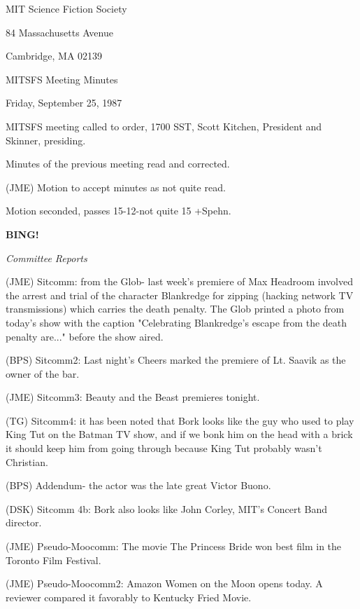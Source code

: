 \documentclass[12pt]{article}
\newcommand{\bing}{{\bf BING!} }
\newcommand{\goto}[1]{\bing \vskip 12pt \centerline{{\em{#1}}}}
\begin{document}
\begin{center}

MIT Science Fiction Society 

84 Massachusetts Avenue

Cambridge, MA 02139

\vspace{12pt}

MITSFS Meeting Minutes 

Friday, September 25, 1987

\end{center}
 
\vspace{18pt}

\setlength{\parskip}{6pt}

\noindent
MITSFS meeting called to order, 1700 SST,
Scott Kitchen, President and Skinner, presiding.

Minutes of the previous meeting read and corrected.

(JME) Motion to accept minutes as not quite read.

Motion seconded, passes 15-12-not quite 15 +Spehn.

\goto{Committee Reports}

(JME) Sitcomm: from the Glob- last week's premiere of Max Headroom involved the arrest and trial of the character Blankredge for zipping (hacking network TV transmissions) which carries the death penalty. The Glob printed a photo from today's show with the caption "Celebrating Blankredge's escape from the death penalty are..." before the show aired.

(BPS) Sitcomm2: Last night's Cheers marked the premiere of Lt. Saavik as the owner of the bar.

(JME) Sitcomm3: Beauty and the Beast premieres tonight.

(TG) Sitcomm4: it has been noted that Bork looks like the guy who used to play King Tut on the Batman TV show, and if we bonk him on the head with a brick it should keep him from going through because King Tut probably wasn't Christian.

(BPS) Addendum- the actor was the late great Victor Buono.

(DSK) Sitcomm 4b: Bork also looks like John Corley, MIT's Concert Band director.

(JME) Pseudo-Moocomm: The movie The Princess Bride won best film in the Toronto Film Festival.

(JME) Pseudo-Moocomm2: Amazon Women on the Moon opens today. A reviewer compared it favorably to Kentucky Fried Movie.
\end{document}
